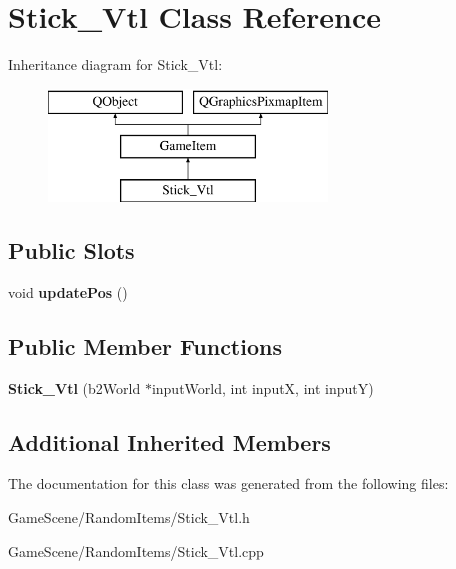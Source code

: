 \hypertarget{classStick__Vtl}{}\section{Stick\+\_\+\+Vtl Class Reference}
\label{classStick__Vtl}
Inheritance diagram for Stick\+\_\+\+Vtl\+:\begin{figure}[H]
\begin{center}
\leavevmode
\includegraphics[height=3.000000cm]{classStick__Vtl}
\end{center}
\end{figure}
\subsection*{Public Slots}
\begin{DoxyCompactItemize}
\item 
void {\bfseries update\+Pos} ()\hypertarget{classStick__Vtl_a92838d5c7c74ecd6843a3060c28ed0d0}{}\label{classStick__Vtl_a92838d5c7c74ecd6843a3060c28ed0d0}

\end{DoxyCompactItemize}
\subsection*{Public Member Functions}
\begin{DoxyCompactItemize}
\item 
{\bfseries Stick\+\_\+\+Vtl} (b2\+World $\ast$input\+World, int inputX, int inputY)\hypertarget{classStick__Vtl_a8b0b4c1ecc362b676b223ffe37fea00d}{}\label{classStick__Vtl_a8b0b4c1ecc362b676b223ffe37fea00d}

\end{DoxyCompactItemize}
\subsection*{Additional Inherited Members}


The documentation for this class was generated from the following files\+:\begin{DoxyCompactItemize}
\item 
Game\+Scene/\+Random\+Items/Stick\+\_\+\+Vtl.\+h\item 
Game\+Scene/\+Random\+Items/Stick\+\_\+\+Vtl.\+cpp\end{DoxyCompactItemize}
